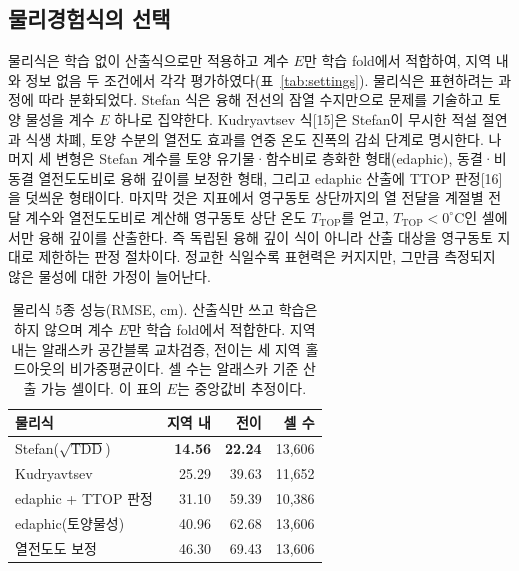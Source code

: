 \documentclass[10pt,twocolumn]{article}
\newcommand{\tabhead}[1]{\textbf{#1}}
\begin{document}
\subsection{물리경험식의 선택}
물리식은 학습 없이 산출식으로만 적용하고 계수 $E$만 학습 fold에서 적합하여, 지역 내와 정보 없음 두 조건에서 각각 평가하였다(표~\ref{tab:settings}). 물리식은 표현하려는 과정에 따라 분화되었다. Stefan 식은 융해 전선의 잠열 수지만으로 문제를 기술하고 토양 물성을 계수 $E$ 하나로 집약한다. Kudryavtsev 식[15]은 Stefan이 무시한 적설 절연과 식생 차폐, 토양 수분의 열전도 효과를 연중 온도 진폭의 감쇠 단계로 명시한다. 나머지 세 변형은 Stefan 계수를 토양 유기물·함수비로 층화한 형태(edaphic), 동결·비동결 열전도도비로 융해 깊이를 보정한 형태, 그리고 edaphic 산출에 TTOP 판정[16]을 덧씌운 형태이다. 마지막 것은 지표에서 영구동토 상단까지의 열 전달을 계절별 전달 계수와 열전도도비로 계산해 영구동토 상단 온도 $T_{\mathrm{TOP}}$를 얻고, $T_{\mathrm{TOP}}<0^\circ\mathrm{C}$인 셀에서만 융해 깊이를 산출한다. 즉 독립된 융해 깊이 식이 아니라 산출 대상을 영구동토 지대로 제한하는 판정 절차이다. 정교한 식일수록 표현력은 커지지만, 그만큼 측정되지 않은 물성에 대한 가정이 늘어난다.

\begin{table}[H]
\centering
\footnotesize
\caption{물리식 5종 성능(RMSE, cm). 산출식만 쓰고 학습은 하지 않으며 계수 $E$만 학습 fold에서 적합한다. 지역 내는 알래스카 공간블록 교차검증, 전이는 세 지역 홀드아웃의 비가중평균이다. 셀 수는 알래스카 기준 산출 가능 셀이다. 이 표의 $E$는 중앙값비 추정이다.}
\label{tab:physics}
\begin{tabular}{@{}lrrr@{}}
\toprule
\tabhead{물리식} & \tabhead{지역 내} & \tabhead{전이} & \tabhead{셀 수} \\
\midrule
Stefan($\sqrt{\mathrm{TDD}}$) & \textbf{14.56} & \textbf{22.24} & 13{,}606 \\
Kudryavtsev & 25.29 & 39.63 & 11{,}652 \\
edaphic + TTOP 판정 & 31.10 & 59.39 & 10{,}386 \\
edaphic(토양물성) & 40.96 & 62.68 & 13{,}606 \\
열전도도 보정 & 46.30 & 69.43 & 13{,}606 \\
\bottomrule
\end{tabular}
\end{table}
\end{document}
